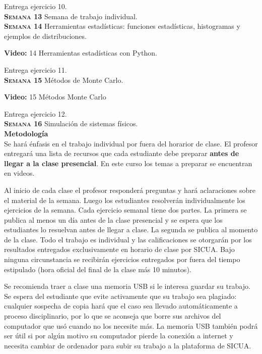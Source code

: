 \documentclass[letterpaper,10pt,onecolumn]{article}
\begin{document}
Entrega ejercicio 10.
\\[-0.3cm]  

\noindent\textbf{\textsc{Semana 13}}  Semana de trabajo individual.
\\[-0.3cm]  


\noindent\textbf{\textsc{Semana 14}} Herramientas
estadísticas: funciones estadísticas, histogramas y ejemplos de
distribuciones.

\textbf{Video:} 14 Herramientas estadísticas con Python.

Entrega ejercicio 11.
\\[-0.3cm] 

\noindent\textbf{\textsc{Semana 15}} Métodos de Monte Carlo.


\textbf{Video:} 15 M\'etodos Monte Carlo 

Entrega ejercicio 12.
\\[-0.3cm] 

\noindent\textbf{\textsc{Semana 16}} Simulaci\'on de sistemas f\'isicos. \\[0.1cm] 


\noindent\textbf{\large {} \quad Metodología}\\[-0.2cm]

\noindent\normalsize Se har\'a \'enfasis en el trabajo individual por
fuera del horarior de clase. El profesor entregar\'a una lista de
recursos que cada estudiante debe preparar {\bf antes de llegar a la
  clase presencial}.   
En este curso los temas a preparar se encuentran en videos.

Al inicio de cada clase el profesor responderá preguntas y 
hará aclaraciones sobre el material de la semana. Luego los
estudiantes resolverán individualmente los ejercicios de la semana.
Cada ejercicio semanal tiene dos partes. La primera se publica al menos un
d\'ia antes de la clase presencial y se espera que los estudiantes lo resuelvan antes de llegar a clase. La segunda se publica al
momento de la clase.
Todo el trabajo es individual y las calificaciones se otorgar\'an por
los resultados entregados exclusivamente en horario de clase por SICUA. 
Bajo ninguna circunstancia se recibirán ejercicios entregados por fuera 
del tiempo estipulado (hora oficial del final de la clase más 10 minutos).

Se recomienda traer a clase una memoria USB si le interesa guardar su 
trabajo. Se espera del estudiante que evite activamente que
su trabajo sea plagiado: cualquier sospecha de copia hará que el caso sea
llevado automáticamente a proceso disciplinario, por lo que se aconseja
que borre sus archivos del computador que usó cuando no los necesite más.
La memoria USB también podrá ser útil si por algún motivo su computador
pierde la conexión a internet y necesita cambiar de ordenador para subir
su trabajo a la plataforma de SICUA.
\\[0.1cm] 
\newpage
\end{document}
